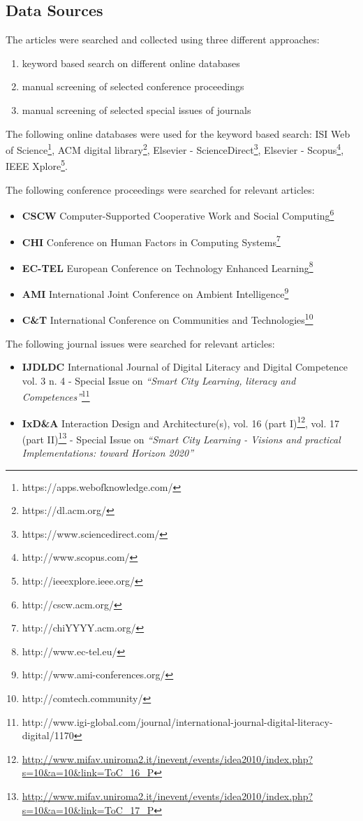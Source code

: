 \subsection{Data Sources}
The articles were searched and collected using three different approaches:

\begin{enumerate}
\item keyword based search on different online databases
\item manual screening of selected conference proceedings
\item manual screening of selected special issues of journals
\end{enumerate}

The following online databases were used for the keyword based search: ISI Web of Science\footnote{https://apps.webofknowledge.com/}, ACM digital library\footnote{https://dl.acm.org/}, Elsevier - ScienceDirect\footnote{https://www.sciencedirect.com/}, Elsevier - Scopus\footnote{http://www.scopus.com/}, IEEE Xplore\footnote{http://ieeexplore.ieee.org/}.

\medskip

The following conference proceedings were searched for relevant articles:
\begin{itemize}
\item \textbf{CSCW} Computer-Supported Cooperative Work and Social Computing\footnote{http://cscw.acm.org/}
\item \textbf{CHI} Conference on Human Factors in Computing Systems\footnote{http://chiYYYY.acm.org/}
\item \textbf{EC-TEL} European Conference on Technology Enhanced Learning\footnote{http://www.ec-tel.eu/}
\item \textbf{AMI} International Joint Conference on Ambient Intelligence\footnote{http://www.ami-conferences.org/}
\item \textbf{C\&T} International Conference on Communities and Technologies\footnote{http://comtech.community/}
\end{itemize}

The following journal issues were searched for relevant articles:
\begin{itemize}
\item \textbf{IJDLDC} International Journal of Digital Literacy and Digital Competence vol. 3 n. 4 - Special Issue on \textit{``Smart City Learning, literacy and Competences''}\footnote{http://www.igi-global.com/journal/international-journal-digital-literacy-digital/1170}
\item \textbf{IxD\&A} Interaction Design and Architecture(s), vol. 16 (part I)\footnote{\url{http://www.mifav.uniroma2.it/inevent/events/idea2010/index.php?s=10&a=10&link=ToC_16_P}}, vol. 17 (part II)\footnote{\url{http://www.mifav.uniroma2.it/inevent/events/idea2010/index.php?s=10&a=10&link=ToC_17_P}} - Special Issue on \textit{``Smart City Learning - Visions and practical Implementations: toward Horizon 2020''} 
\end{itemize}

